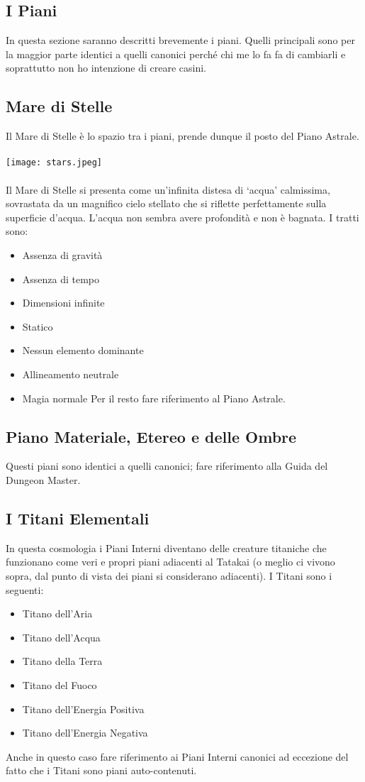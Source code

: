 \documentclass[a4paper]{report}
\begin{document}
\begin{multicols}{2}
\section{I Piani}
In questa sezione saranno descritti brevemente i piani. Quelli principali sono per la maggior parte identici a quelli canonici perché chi me lo fa fa di cambiarli e soprattutto non ho intenzione di creare casini.
\subsection*{Mare di Stelle}
Il Mare di Stelle è lo spazio tra i piani, prende dunque il posto del Piano Astrale.\\
\\
\texttt{[image: stars.jpeg]}\\
\\
Il Mare di Stelle si presenta come un'infinita distesa di \enquote*{acqua} calmissima, sovrastata da un magnifico cielo stellato che si riflette perfettamente sulla superficie d'acqua. L'acqua non sembra avere profondità e non è bagnata. I tratti sono:
\begin{itemize}
	\item Assenza di gravità
	\item Assenza di tempo
	\item Dimensioni infinite
	\item Statico
	\item Nessun elemento dominante
	\item Allineamento neutrale
	\item Magia normale
Per il resto fare riferimento al Piano Astrale.
\end{itemize}
\subsection*{Piano Materiale, Etereo e delle Ombre}
Questi piani sono identici a quelli canonici; fare riferimento alla Guida del Dungeon Master.
\subsection*{I Titani Elementali}
In questa cosmologia i Piani Interni diventano delle creature titaniche che funzionano come veri e propri piani adiacenti al Tatakai (o meglio ci vivono sopra, dal punto di vista dei piani si considerano adiacenti). I Titani sono i seguenti:
\begin{itemize}
\item Titano dell'Aria
\item Titano dell'Acqua
\item Titano della Terra
\item Titano del Fuoco
\item Titano dell'Energia Positiva
\item Titano dell'Energia Negativa
\end{itemize}
Anche in questo caso fare riferimento ai Piani Interni canonici ad eccezione del fatto che i Titani sono piani auto-contenuti.

\end{multicols}
\end{document}
